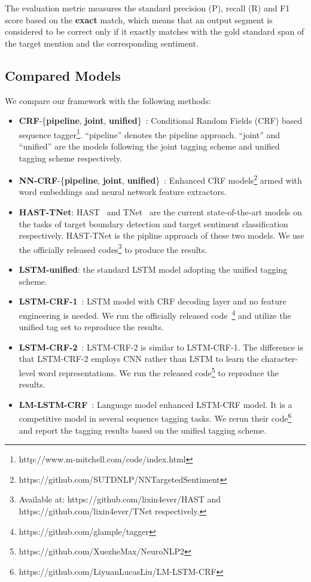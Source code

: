 \documentclass[letterpaper]{article}
\begin{document}
The evaluation metric measures the standard precision (P), recall (R) and F1 score based on the \textbf{exact} match, which means that an output segment is considered to be correct only if it exactly matches with the gold standard span of the target mention and the corresponding sentiment.

\subsection{Compared Models}
We compare our framework with the following methods:
\begin{itemize}
    \item \textbf{CRF}-\{\textbf{pipeline}, \textbf{joint}, \textbf{unified}\}~\cite{D13-1171}: Conditional Random Fields (CRF) based sequence tagger\footnote{http://www.m-mitchell.com/code/index.html}. ``pipeline'' denotes the pipeline approach. ``joint'' and ``unified'' are the models following the joint tagging scheme and unified tagging scheme respectively.
    \item \textbf{NN-CRF}-\{\textbf{pipeline}, \textbf{joint}, \textbf{unified}\}~\cite{D15-1073}: Enhanced CRF models\footnote{https://github.com/SUTDNLP/NNTargetedSentiment} armed with word embeddings and neural network feature extractors.
    \item \textbf{HAST-TNet}: HAST~\cite{li2018aspect} and TNet~\cite{P18-1087} are the current state-of-the-art models on the tasks of target boundary detection and target sentiment classification respectively. HAST-TNet is the pipline approach of these two models. We use the officially released codes\footnote{Available at: https://github.com/lixin4ever/HAST and  https://github.com/lixin4ever/TNet respectively.} to produce the results.
    \item \textbf{LSTM-unified}: the standard LSTM model adopting the unified tagging scheme.
    \item \textbf{LSTM-CRF-1}~\cite{N16-1030}: LSTM model with CRF decoding layer and no feature engineering is needed. We run the officially released code~\footnote{https://github.com/glample/tagger} and utilize the unified tag set to reproduce the results.
    \item \textbf{LSTM-CRF-2}~\cite{P16-1101}: LSTM-CRF-2 is similar to LSTM-CRF-1. The difference is that LSTM-CRF-2 employs CNN rather than LSTM to learn the character-level word representations. We run the released code\footnote{https://github.com/XuezheMax/NeuroNLP2} to reproduce the results.
    \item \textbf{LM-LSTM-CRF}~\cite{liu2017empower}: Language model enhanced LSTM-CRF model. It is a competitive model in several sequence tagging tasks. We rerun their code\footnote{https://github.com/LiyuanLucasLiu/LM-LSTM-CRF} and report the tagging results based on the unified tagging scheme.
\end{itemize}
\end{document}
